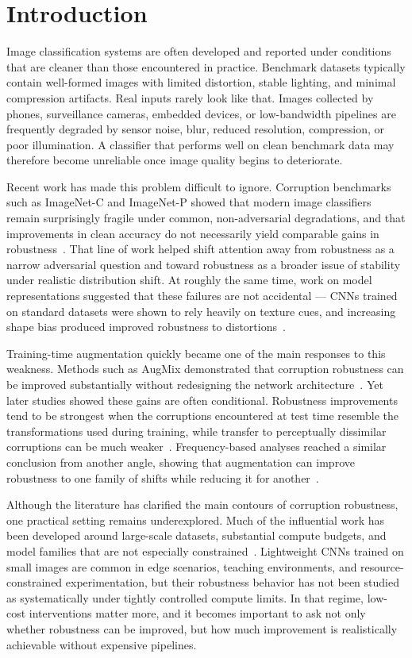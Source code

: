 \documentclass[conference]{IEEEtran}
\begin{document}
\section{Introduction}

Image classification systems are often developed and reported under conditions that are cleaner than those encountered in practice. Benchmark datasets typically contain well-formed images with limited distortion, stable lighting, and minimal compression artifacts. Real inputs rarely look like that. Images collected by phones, surveillance cameras, embedded devices, or low-bandwidth pipelines are frequently degraded by sensor noise, blur, reduced resolution, compression, or poor illumination. A classifier that performs well on clean benchmark data may therefore become unreliable once image quality begins to deteriorate.

Recent work has made this problem difficult to ignore. Corruption benchmarks such as ImageNet-C and ImageNet-P showed that modern image classifiers remain surprisingly fragile under common, non-adversarial degradations, and that improvements in clean accuracy do not necessarily yield comparable gains in robustness~\cite{hendrycks2019}. That line of work helped shift attention away from robustness as a narrow adversarial question and toward robustness as a broader issue of stability under realistic distribution shift. At roughly the same time, work on model representations suggested that these failures are not accidental --- CNNs trained on standard datasets were shown to rely heavily on texture cues, and increasing shape bias produced improved robustness to distortions~\cite{geirhos2019}.

Training-time augmentation quickly became one of the main responses to this weakness. Methods such as AugMix demonstrated that corruption robustness can be improved substantially without redesigning the network architecture~\cite{hendrycks2020}. Yet later studies showed these gains are often conditional. Robustness improvements tend to be strongest when the corruptions encountered at test time resemble the transformations used during training, while transfer to perceptually dissimilar corruptions can be much weaker~\cite{mintun2021}. Frequency-based analyses reached a similar conclusion from another angle, showing that augmentation can improve robustness to one family of shifts while reducing it for another~\cite{yin2019}.

Although the literature has clarified the main contours of corruption robustness, one practical setting remains underexplored. Much of the influential work has been developed around large-scale datasets, substantial compute budgets, and model families that are not especially constrained~\cite{hendrycks2019,hendrycks2020,mintun2021,geirhos2019,rusak2020,yin2019}. Lightweight CNNs trained on small images are common in edge scenarios, teaching environments, and resource-constrained experimentation, but their robustness behavior has not been studied as systematically under tightly controlled compute limits. In that regime, low-cost interventions matter more, and it becomes important to ask not only whether robustness can be improved, but how much improvement is realistically achievable without expensive pipelines.
\end{document}
